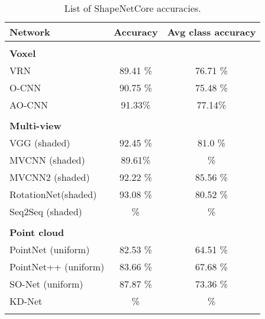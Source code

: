 \begin{table}[]
	\centering
	\begin{tabular}{lcc}
		\hline
		\textbf{Network}       & Accuracy & Avg class accuracy \\ \hline
		                       &          &                    \\
		\textbf{Voxel }        &          &                    \\
		VRN                    & 89.41 \% &      76.71 \%      \\
		O-CNN                  & 90.75 \% &      75.48 \%      \\
		AO-CNN                 & 91.33\%  &      77.14\%       \\
		                       &          &                    \\
		\textbf{Multi-view }   &          &                    \\
		VGG (shaded)           & 92.45 \% &      81.0 \%       \\
		MVCNN (shaded)         & 89.61\%  &         \%         \\
		MVCNN2 (shaded)        & 92.22 \% &      85.56 \%      \\
		RotationNet(shaded)    & 93.08 \% &      80.52 \%      \\
		Seq2Seq (shaded)       &    \%    &         \%         \\
		                       &          &                    \\
		\textbf{Point cloud  } &          &                    \\
		PointNet (uniform)     & 82.53 \% &      64.51 \%      \\
		PointNet++ (uniform)   & 83.66 \% &      67.68 \%      \\
		SO-Net (uniform)       & 87.87 \% &      73.36 \%      \\
		KD-Net                 &    \%    &         \%         \\
		                       &          &                    \\ \hline
	\end{tabular}
\caption{List of ShapeNetCore accuracies.}
\label{Table:saccs}
\end{table}